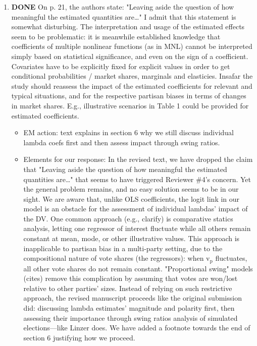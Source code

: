 \documentclass{article}
\begin{document}
\begin{enumerate}
\begin{itemize}
\end{itemize}
\item {\bfseries\sffamily DONE} On p. 21, the authors state: "Leaving aside the question of how meaningful the estimated quantities are\ldots{}"  I admit that this statement is somewhat disturbing. The interpretation and usage of the estimated effects seem to be problematic: it is meanwhile established knowledge that coefficients of multiple nonlinear functions (as in MNL)  cannot be interpreted simply based on statistical significance, and even on the sign of a coefficient. Covariates have to be explicitly fixed for explicit values in order to get conditional probabilities / market shares, marginals and elasticies. Insafar the study should reassess the impact of the estimated coefficients for relevant and typical situations, and for the respective partisan biases in terms of  changes in market shares. E.g., illustrative scenarios in Table 1 could be provided for estimated coefficients.
\label{sec:orgheadline29}
\begin{itemize}
\item EM action: text explains in section 6 why we still discuss individual lambda coefs first and then assess impact through swing ratios.
\item Elements for our response: In the revised text, we have dropped the claim that "Leaving aside the question of how meaningful the estimated quantities are\ldots{}" that seems to have triggered Reviewer \#4's concern. Yet the general problem remains, and no easy solution seems to be in our sight. We are aware that, unlike OLS coefficients, the logit link in our model is an obstacle for the assessment of individual lambdas' impact of the DV. One common approach (e.g., clarify) is comparative statics analysis, letting one regressor of interest fluctuate while all others remain constant at mean, mode, or other illustrative values. This approach is inapplicable to partisan bias in a multi-party setting, due to the compositional nature of vote shares (the regressors): when v\(_{\text{p}}\) fluctuates, all other vote shares do not remain constant. "Proportional swing" models (cites) remove this complication by assuming that votes are won/lost relative to other parties' sizes. Instead of relying on such restrictive approach, the revised manuscript proceeds like the original submission did: discussing lambda estimates' magnitude and polarity first, then assessing their importance through swing ratios analysis of simulated elections---like Linzer does. We have added a footnote towards the end of section 6 justifying how we proceed.

\end{itemize}
\end{enumerate}
\end{document}
